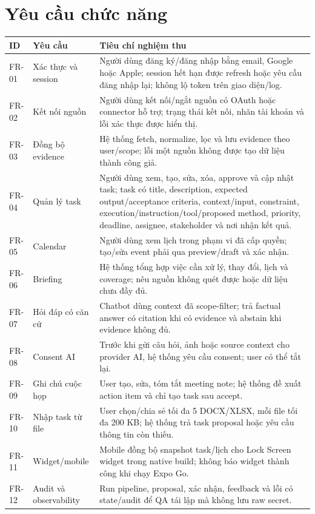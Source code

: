 \documentclass[12pt,a4paper]{article}
\begin{document}
\section{Yêu cầu chức năng}
\begin{longtable}{p{1.7cm}p{4cm}p{8.3cm}}
\toprule ID & Yêu cầu & Tiêu chí nghiệm thu \\ \midrule\endhead
FR-01 & Xác thực và session & Người dùng đăng ký/đăng nhập bằng email, Google hoặc Apple; session hết hạn được refresh hoặc yêu cầu đăng nhập lại; không lộ token trên giao diện/log. \\
FR-02 & Kết nối nguồn & Người dùng kết nối/ngắt nguồn có OAuth hoặc connector hỗ trợ; trạng thái kết nối, nhãn tài khoản và lỗi xác thực được hiển thị. \\
FR-03 & Đồng bộ evidence & Hệ thống fetch, normalize, lọc và lưu evidence theo user/scope; lỗi một nguồn không được tạo dữ liệu thành công giả. \\
FR-04 & Quản lý task & Người dùng xem, tạo, sửa, xóa, approve và cập nhật task; task có title, description, expected output/acceptance criteria, context/input, constraint, execution/instruction/tool/proposed method, priority, deadline, assignee, stakeholder và nơi nhận kết quả. \\
FR-05 & Calendar & Người dùng xem lịch trong phạm vi đã cấp quyền; tạo/sửa event phải qua preview/draft và xác nhận. \\
FR-06 & Briefing & Hệ thống tổng hợp việc cần xử lý, thay đổi, lịch và coverage; nêu nguồn không quét được hoặc dữ liệu chưa đầy đủ. \\
FR-07 & Hỏi đáp có căn cứ & Chatbot dùng context đã scope-filter; trả factual answer có citation khi có evidence và abstain khi evidence không đủ. \\
FR-08 & Consent AI & Trước khi gửi câu hỏi, ảnh hoặc source context cho provider AI, hệ thống yêu cầu consent; user có thể tắt lại. \\
FR-09 & Ghi chú cuộc họp & User tạo, sửa, tóm tắt meeting note; hệ thống đề xuất action item và chỉ tạo task sau accept. \\
FR-10 & Nhập task từ file & User chọn/chia sẻ tối đa 5 DOCX/XLSX, mỗi file tối đa 200 KB; hệ thống trả task proposal hoặc yêu cầu thông tin còn thiếu. \\
FR-11 & Widget/mobile & Mobile đồng bộ snapshot task/lịch cho Lock Screen widget trong native build; không báo widget thành công khi chạy Expo Go. \\
FR-12 & Audit và observability & Run pipeline, proposal, xác nhận, feedback và lỗi có state/audit để QA tái lập mà không lưu raw secret. \\

\end{longtable}
\end{document}
